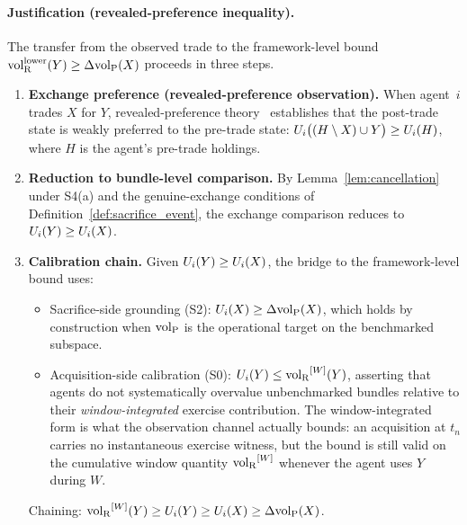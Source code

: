 \paragraph{Justification (revealed-preference inequality).}
The transfer from the observed trade to the framework-level
bound ${\operatorname{vol}_{\mathrm{R}}^{\mathrm{lower}}}(Y) \geq \Delta{\operatorname{vol}_{\mathrm{P}}}(X)$ proceeds in three
steps.

\begin{enumerate}
\item \textbf{Exchange preference (revealed-preference
  observation).}
  When agent~$i$ trades $X$ for $Y$, revealed-preference
  theory~\citep{samuelson1938note} establishes that the
  post-trade state is weakly preferred to the pre-trade state:
  $U_i\bigl((H \setminus X) \cup Y\bigr) \geq U_i(H)$,
  where $H$ is the agent's pre-trade holdings.

\item \textbf{Reduction to bundle-level comparison.}
  By Lemma~\ref{lem:cancellation} under S4(a) and the
  genuine-exchange conditions of
  Definition~\ref{def:sacrifice_event}, the exchange comparison
  reduces to $U_i(Y) \geq U_i(X)$.

\item \textbf{Calibration chain.}
  Given $U_i(Y) \geq U_i(X)$, the bridge to the framework-level
  bound uses:
  \begin{itemize}
  \item Sacrifice-side grounding (S2):
    $U_i(X) \geq \Delta{\operatorname{vol}_{\mathrm{P}}}(X)$, which holds by construction
    when ${\operatorname{vol}_{\mathrm{P}}}$ is the operational target on the benchmarked
    subspace.
  \item Acquisition-side calibration (S0):
    $U_i(Y) \leq {\operatorname{vol}_{\mathrm{R}}}^{[W]}(Y)$, asserting that agents do not
    systematically overvalue unbenchmarked bundles relative to
    their \emph{window-integrated} exercise contribution.  The
    window-integrated form is what the observation channel
    actually bounds: an acquisition at $t_n$ carries no
    instantaneous exercise witness, but the bound is still
    valid on the cumulative window quantity ${\operatorname{vol}_{\mathrm{R}}}^{[W]}$
    whenever the agent uses $Y$ during $W$.
  \end{itemize}
  Chaining: ${\operatorname{vol}_{\mathrm{R}}}^{[W]}(Y) \geq U_i(Y) \geq U_i(X) \geq
  \Delta{\operatorname{vol}_{\mathrm{P}}}(X)$.
\end{enumerate}

